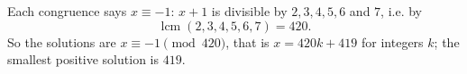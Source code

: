 Each congruence says $x\equiv-1$: $x+1$ is divisible by $2,3,4,5,6$ and $7$, i.e. by
\[\operatorname{lcm}(2,3,4,5,6,7)=420 .\]
So the solutions are $x\equiv-1\pmod{420}$, that is $\boxed{x=420k+419}$ for integers $k$; the smallest positive solution is $419$.
